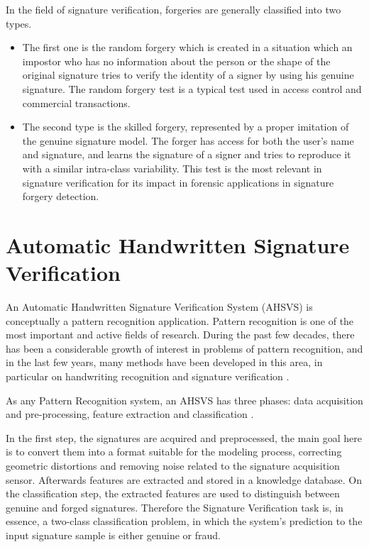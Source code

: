 In the field of signature verification, forgeries are generally classified into two types. 
\begin{itemize}
\item The first one is the random forgery which is created in a situation which an impostor who has no information about the person or the shape of the original signature tries to verify the identity of a signer by using his genuine signature. The random forgery test is a typical test used in access control and commercial transactions. 

\item The second type is the skilled forgery, represented by a proper imitation of the genuine signature model. The forger has access for both the user’s name and signature, and learns the signature of a signer and tries to reproduce it with a similar intra-class variability. This test is the most relevant in signature verification for its impact in forensic applications in signature forgery detection. 
 
\end{itemize}




\section{Automatic Handwritten Signature Verification}
An Automatic Handwritten Signature Verification System (AHSVS) is conceptually a pattern recognition application. Pattern recognition is one of the most important and active fields of research. During the past few decades, there has been a considerable growth of interest in problems of pattern recognition, and in the last few years, many methods have been developed in this area, in particular on handwriting recognition and signature verification \cite{book}. 

As any Pattern Recognition system, an AHSVS has three phases: data acquisition and pre-processing, feature extraction and classification \cite{impedovo2008state}.

In the first step, the signatures are acquired and preprocessed, the main goal here is to convert them into a format suitable for the modeling process, correcting geometric distortions and removing noise related to the signature acquisition sensor. Afterwards features are extracted and stored in a knowledge database.  On the classification step, the extracted features are used to distinguish between genuine and forged signatures. Therefore the Signature Verification task is, in essence, a two-class classification problem, in which the system's prediction to the input signature sample is either genuine or fraud.

